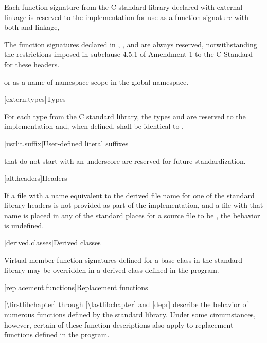 \pnum
Each function signature from the C standard library declared with
%
external linkage
is reserved to the implementation for use as
a function signature with both
%
and
%
linkage,
\begin{footnote}
The function signatures declared in
%
,
,
and
are always reserved, notwithstanding the restrictions imposed in subclause
4.5.1 of Amendment 1 to the C Standard for these headers.
\end{footnote}
or as a name of namespace scope in the global namespace.

[extern.types]{Types}

\pnum
For each type  from the C standard library,
the types
and
are reserved to the implementation and, when defined,
shall be identical to
.

[usrlit.suffix]{User-defined literal suffixes}

\pnum
{} that do not start with an underscore are reserved for future standardization.

[alt.headers]{Headers}

\pnum
If a file with a name
equivalent to the derived file name for one of the \Cpp{} standard library headers
is not provided as part of the implementation, and a file with that name
is placed in any of the standard places for a source file to be ,
the behavior is undefined.%
%

[derived.classes]{Derived classes}

\pnum
Virtual member function signatures defined
%
for a base class in the \Cpp{} standard
%
%
library may be overridden in a derived class defined in the program.

[replacement.functions]{Replacement functions}

\pnum
{}%
\ref{\firstlibchapter} through \ref{\lastlibchapter} and \ref{depr}
describe the behavior of numerous functions defined by
the \Cpp{} standard library.
Under some circumstances,
%
however, certain of these function descriptions also apply to replacement functions defined
in the program.

